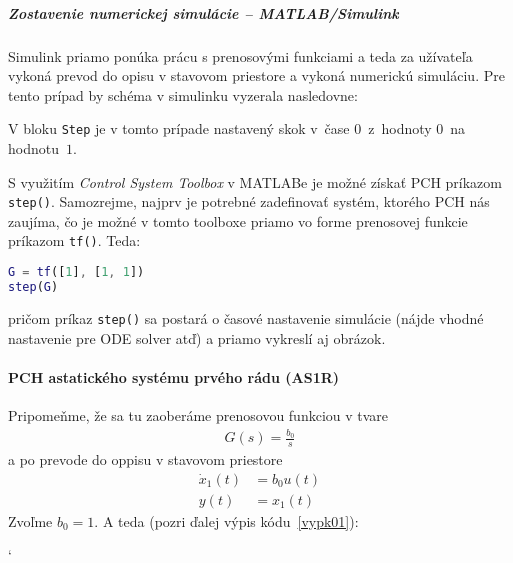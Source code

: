 \documentclass[a4paper, 10pt, ]{article}
\begin{document}
\subparagraph{Zostavenie numerickej simulácie -- MATLAB/Simulink}

Simulink priamo ponúka prácu s prenosovými funkciami a teda za užívateľa vykoná prevod do opisu v stavovom priestore a vykoná numerickú simuláciu. Pre tento prípad by schéma v simulinku vyzerala nasledovne:

\begin{center}


    \vspace{-5mm}

	\label{sim_PCHSS1R}

    \vspace{-1mm}

\end{center}

V bloku \lstinline|Step| je v tomto prípade nastavený skok v~čase $0$~z~hodnoty $0$~na hodnotu~$1$.

\medskip

S využitím \emph{Control System Toolbox} v MATLABe je možné získať PCH príkazom  \lstinline|step()|. Samozrejme, najprv je potrebné zadefinovať systém, ktorého PCH nás zaujíma, čo je možné v tomto toolboxe priamo vo forme prenosovej funkcie príkazom  \lstinline|tf()|. Teda:
\begin{lstlisting}[language=Matlab,]
G = tf([1], [1, 1])
step(G)
\end{lstlisting}
\noindent
pričom príkaz \lstinline|step()| sa postará o časové nastavenie simulácie (nájde vhodné nastavenie pre ODE solver atď) a priamo vykreslí aj obrázok.











\paragraph{PCH astatického systému prvého rádu (AS1R)}

Pripomeňme, že sa tu zaoberáme prenosovou funkciou v tvare
\begin{align} \label{typ1radtf3}
    G(s) = \frac{b_0}{s}
\end{align}
a po prevode do oppisu v stavovom priestore
\begin{align}
    \dot x_1(t) &= b_0 u(t) \\
    y(t) &= x_1(t)
\end{align}
Zvoľme $b_0 = 1$. A teda (pozri ďalej výpis kódu~\ref{vypk01}):
{\catcode`

}
\noindent
\end{document}
